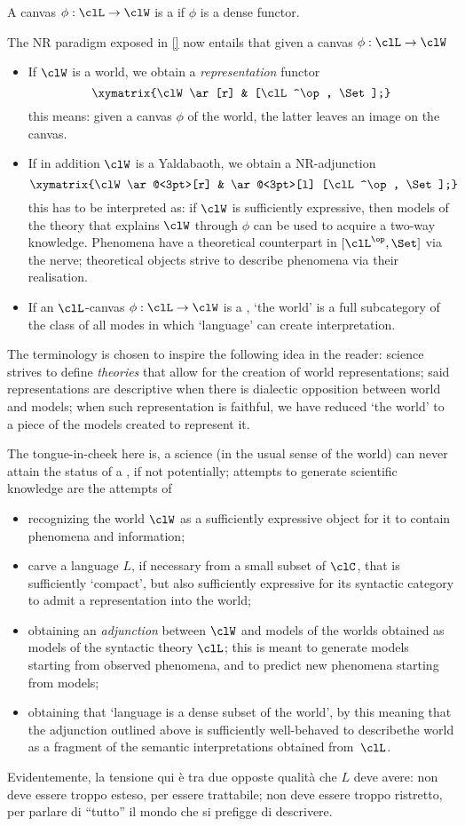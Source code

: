 \documentclass[a4paper]{../birkjour}
\begin{document}
A canvas $\phi : \clL \to \clW$ is a \emph{\science} if $\phi$ is a dense functor.
\begin{remark}
  The NR paradigm exposed in \autoref{} now entails that given a canvas $\phi : \clL \to \clW$
  \begin{itemize}
    \item If $\clW$ is a world, we obtain a \emph{representation} functor 
    \[ \xymatrix{\clW \ar[r] & [\clL^\op, \Set];} \]
    this means: given a canvas $\phi$ of the world, the latter leaves an image on the canvas.
    \item If in addition $\clW$ is a Yaldabaoth, we obtain a NR-adjunction
    \[\xymatrix{\clW \ar@<3pt>[r] & \ar@<3pt>[l] [\clL^\op, \Set];}\]
    this has to be interpreted as: if $\clW$ is sufficiently expressive, then models of the theory that explains $\clW$ through $\phi$ can be used to acquire a two-way knowledge. Phenomena have a theoretical counterpart in $[\clL^\op,\Set]$ via the nerve; theoretical objects strive to describe phenomena via their realisation.
    \item If an $\clL$-canvas $\phi : \clL \to \clW$ is a \science, `the world' is a full subcategory of the class of all modes in which `language' can create interpretation.
  \end{itemize}
\end{remark}
The terminology is chosen to inspire the following idea in the reader: science strives to define \emph{theories} that allow for the creation of world representations; said representations are descriptive when there is dialectic opposition between world and models; when such representation is faithful, we have reduced `the world' to a piece of the models created to represent it.

The tongue-in-cheek here is, a science (in the usual sense of the world) can never attain the status of a \science, if not potentially; attempts to generate scientific knowledge are the attempts of
\begin{itemize}
  \item recognizing the world $\clW$ as a sufficiently expressive object for it to contain phenomena and information;
  \item carve a language $L$, if necessary from a small subset of $\clC$, that is sufficiently `compact', but also sufficiently expressive for its syntactic category to admit a representation into the world;
  \item obtaining an \emph{adjunction} between $\clW$ and models of the worlds obtained as models of the syntactic theory $\clL$; this is meant to generate models starting from observed phenomena, and to predict new phenomena starting from models;
  \item obtaining that `language is a dense subset of the world', by this meaning that the adjunction outlined above is sufficiently well-behaved to describethe world as a fragment of the semantic interpretations obtained from~$\clL$.
\end{itemize}
Evidentemente, la tensione qui è tra due opposte qualità che $L$ deve avere: non deve essere troppo esteso, per essere trattabile; non deve essere troppo ristretto, per parlare di ``tutto'' il mondo che si prefigge di descrivere.
\end{document}
